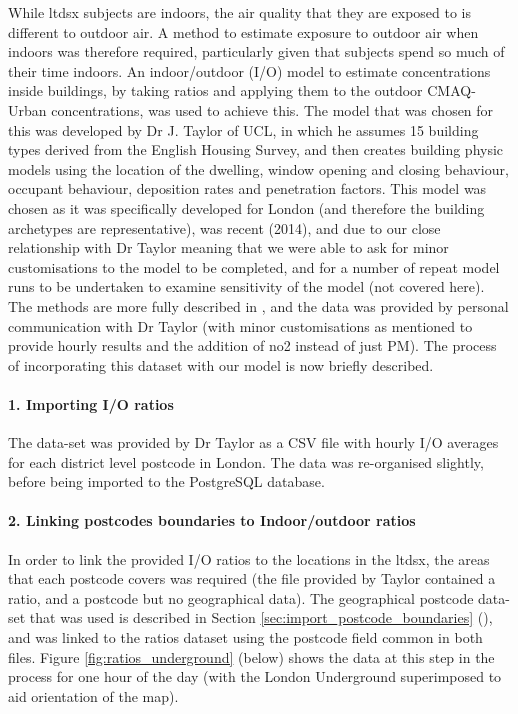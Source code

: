 While \gls{ltdsx} subjects are indoors, the air quality that they are exposed to is different to outdoor air. A method to estimate exposure to outdoor air when indoors was therefore required, particularly given that subjects spend so much of their time indoors. An indoor/outdoor (I/O) model to estimate concentrations inside buildings, by taking ratios and applying them to the outdoor CMAQ-Urban concentrations, was used to achieve this. The model that was chosen for this was developed by Dr J. Taylor of UCL, in which he assumes 15 building types derived from the English Housing Survey, and then creates building physic models using the location of the dwelling, window opening and closing behaviour, occupant behaviour, deposition rates and penetration factors. This model was chosen as it was specifically developed for London (and therefore the building archetypes are representative), was recent (2014), and due to our close relationship with Dr Taylor meaning that we were able to ask for minor customisations to the model to be completed, and for a number of repeat model runs to be undertaken to examine sensitivity of the model (not covered here). The methods are more fully described in \cite{Taylor2014}, and the data was provided by personal communication with Dr Taylor (with minor customisations as mentioned  to provide hourly results and the addition of \gls{no2} instead of just PM). The process of incorporating this dataset with our model is now briefly described.

            \paragraph{1. Importing I/O ratios}
            \label{sec:importing_io_ratios}
	
The data-set was provided by Dr Taylor as a CSV file with hourly I/O averages for each district level postcode in London. The data was re-organised slightly, before being imported to the PostgreSQL database.

            \paragraph{2. Linking postcodes boundaries to Indoor/outdoor ratios}
            \label{sec:linking_postcodes_to_ratios}

In order to link the provided I/O ratios to the locations in the \gls{ltdsx}, the areas that each postcode covers was required (the file provided by Taylor contained a ratio, and a postcode but no geographical data). The geographical postcode data-set that was used is described in Section \ref{sec:import_postcode_boundaries} (), and was linked to the ratios dataset using the postcode field common in both files. Figure \ref{fig:ratios_underground} (below) shows the data at this step in the process for one hour of the day (with the London Underground superimposed to aid orientation of the map).

